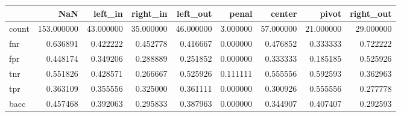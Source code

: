 \begin{tabular}{lrrrrrrrr}
\toprule
{} &         NaN &    left\_in &   right\_in &   left\_out &     penal &     center &      pivot &  right\_out \\
\midrule
count &  153.000000 &  43.000000 &  35.000000 &  46.000000 &  3.000000 &  57.000000 &  21.000000 &  29.000000 \\
fnr   &    0.636891 &   0.422222 &   0.452778 &   0.416667 &  0.000000 &   0.476852 &   0.333333 &   0.722222 \\
fpr   &    0.448174 &   0.349206 &   0.288889 &   0.251852 &  0.000000 &   0.333333 &   0.185185 &   0.525926 \\
tnr   &    0.551826 &   0.428571 &   0.266667 &   0.525926 &  0.111111 &   0.555556 &   0.592593 &   0.362963 \\
tpr   &    0.363109 &   0.355556 &   0.325000 &   0.361111 &  0.000000 &   0.300926 &   0.555556 &   0.277778 \\
bacc  &    0.457468 &   0.392063 &   0.295833 &   0.387963 &  0.000000 &   0.344907 &   0.407407 &   0.292593 \\
\bottomrule
\end{tabular}
